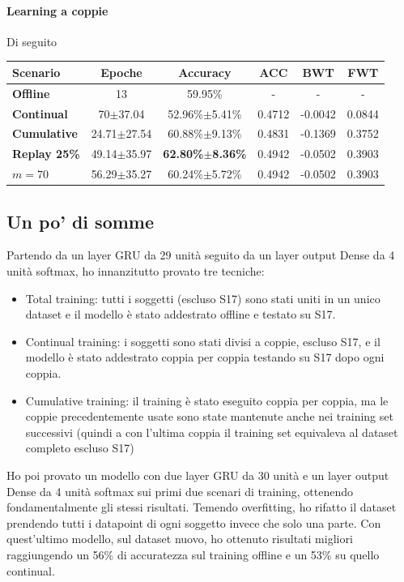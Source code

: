 \documentclass[11pt, a4paper, twoside, openright]{book}
\begin{document}
\paragraph{Learning a coppie} Di seguito\\
\begin{tabular}{l|c|c|c|c|c}
    \textbf{Scenario} & \textbf{Epoche} & \textbf{Accuracy} & \textbf{ACC} & \textbf{BWT} & \textbf{FWT} \\
    \hline 
    \textbf{Offline} & 13 & 59.95\% & - & - & - \\
    \textbf{Continual} & 70$\pm$37.04 & 52.96\%$\pm$5.41\% & 0.4712 & -0.0042 & 0.0844\\
    \textbf{Cumulative} & 24.71$\pm$27.54 & 60.88\%$\pm$9.13\% & 0.4831 & -0.1369 & 0.3752\\
    \textbf{Replay 25\%} & 49.14$\pm$35.97 & \textbf{62.80\%$\pm$8.36\%} & 0.4942 & -0.0502 & 0.3903\\
    \textbf{$m = 70$} & 56.29$\pm$35.27 & 60.24\%$\pm$5.72\% & 0.4942 & -0.0502 & 0.3903\\
\end{tabular}
\subsection{Un po' di somme}
Partendo da un layer GRU da 29 unità seguito da un layer output Dense da 4 unità softmax, ho innanzitutto provato tre tecniche:
\begin{itemize}
    \item Total training: tutti i soggetti (escluso S17) sono stati uniti in un unico dataset e il modello è stato addestrato offline e testato su S17.
    \item Continual training: i soggetti sono stati divisi a coppie, escluso S17, e il modello è stato addestrato coppia per coppia testando su S17 dopo ogni coppia.
    \item Cumulative training: il training è stato eseguito coppia per coppia, ma le coppie precedentemente usate sono state mantenute anche nei training set successivi (quindi a con l'ultima coppia il training set equivaleva al dataset completo escluso S17)
\end{itemize}
Ho poi provato un modello con due layer GRU da 30 unità e un layer output Dense da 4 unità softmax sui primi due scenari di training, ottenendo fondamentalmente gli stessi risultati. Temendo overfitting, ho rifatto il dataset prendendo tutti i datapoint di ogni soggetto invece che solo una parte. Con quest'ultimo modello, sul dataset nuovo, ho ottenuto risultati migliori raggiungendo un 56\% di accuratezza sul training offline e un 53\% su quello continual.
\end{document}
